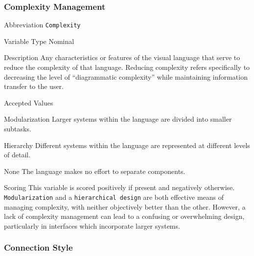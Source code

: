 \subsubsection{Complexity Management}
\label{subsubsec:complexity}

\begin{AlignedDesc}
  \item[Abbreviation] \texttt{Complexity}

  \item[Variable Type] Nominal

  \item[Description] Any characteristics or features of the visual language
  that serve to reduce the complexity of that language. Reducing complexity
  refers specifically to decreasing the level of ``diagrammatic
  complexity'' while maintaining information transfer to the
  user.~\cite{moody2009}

  \item[Accepted Values]

  \begin{AlignedDesc}
    \item[Modularization] Larger systems within the language are divided
    into smaller subtasks.~\cite{moody2009}
    \item[Hierarchy] Different systems within the language are represented
    at different levels of detail.~\cite{moody2009}
    \item[None] The language makes no effort to separate components.
  \end{AlignedDesc}

  \item[Scoring] This variable is scored positively if present and
  negatively otherwise.  \texttt{Modularization} and a \texttt{hierarchical
  design} are both effective means of managing complexity, with neither
  objectively better than the other. However, a lack of complexity
  management can lead to a confusing or overwhelming design, particularly
  in interfaces which incorporate larger systems.

\end{AlignedDesc}

\subsubsection{Connection Style}
\label{subsubsec:connection}

